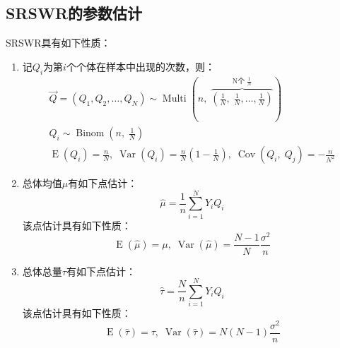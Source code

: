\subsection{SRSWR的参数估计}
\begin{property}\label{prop:SRSWR}
	SRSWR具有如下性质：
	\begin{enumerate}
		\item 记$Q_i$为第$i$个个体在样本中出现的次数，则：
		\begin{gather*}
			\overrightarrow{Q}=(Q_1,Q_2,\dots,Q_N)\sim\operatorname{Multi}\left(n,\; \overbrace{\left(\frac{1}{N},\;\frac{1}{N},\dots,\frac{1}{N}\right)}^{\text{N个}\;\frac{1}{N}}\right)\\
			Q_i\sim\operatorname{Binom}\left(n,\;\frac{1}{N}\right) \\
			\operatorname{E}(Q_i)=\frac{n}{N},\;\operatorname{Var}(Q_i)=\frac{n}{N}\left(1-\frac{1}{N}\right) ,\;\operatorname{Cov}(Q_i,\;Q_j)=-\frac{n}{N^2}
		\end{gather*}
		\item 总体均值$\mu$有如下点估计：
		\begin{equation*}
			\hat{\mu}=\frac{1}{n}\sum_{i=1}^{N}Y_iQ_i
		\end{equation*}
		该点估计具有如下性质：
		\begin{equation*}
			\operatorname{E}(\hat{\mu})=\mu,\;\operatorname{Var}(\hat{\mu})=\frac{N-1}{N}\frac{\sigma^2}{n}
		\end{equation*}
		\item 总体总量$\tau$有如下点估计：
		\begin{equation*}
			\hat{\tau}=\frac{N}{n}\sum_{i=1}^NY_iQ_i
		\end{equation*}
		该点估计具有如下性质：
		\begin{equation*}
			\operatorname{E}(\hat{\tau})=\tau,\;\operatorname{Var}(\hat{\tau})=N(N-1)\frac{\sigma^2}{n}
		\end{equation*}
	\end{enumerate}
\end{property}
